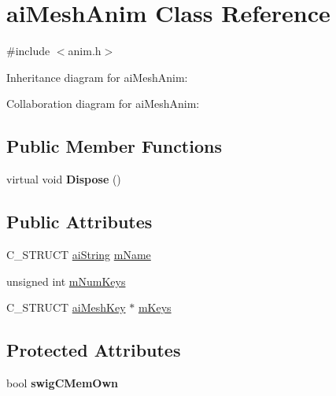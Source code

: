 \hypertarget{structai_mesh_anim}{\section{ai\+Mesh\+Anim Class Reference}
\label{structai_mesh_anim}
}


{\ttfamily \#include $<$anim.\+h$>$}



Inheritance diagram for ai\+Mesh\+Anim\+:


Collaboration diagram for ai\+Mesh\+Anim\+:
\subsection*{Public Member Functions}
\begin{DoxyCompactItemize}
\item 
\hypertarget{structai_mesh_anim_a9a456324848d6b3cd284720b9e6e7f54}{virtual void {\bfseries Dispose} ()}\label{structai_mesh_anim_a9a456324848d6b3cd284720b9e6e7f54}

\end{DoxyCompactItemize}
\subsection*{Public Attributes}
\begin{DoxyCompactItemize}
\item 
C\+\_\+\+S\+T\+R\+U\+C\+T \hyperlink{structai_string}{ai\+String} \hyperlink{structai_mesh_anim_a20751a739377fdba514c676ef4bda4c7}{m\+Name}
\item 
unsigned int \hyperlink{structai_mesh_anim_aa8702d42bf619ccc8414a556f41634d8}{m\+Num\+Keys}
\item 
C\+\_\+\+S\+T\+R\+U\+C\+T \hyperlink{structai_mesh_key}{ai\+Mesh\+Key} $\ast$ \hyperlink{structai_mesh_anim_abc78e9f6d7583c541447e8c389488f1b}{m\+Keys}
\end{DoxyCompactItemize}
\subsection*{Protected Attributes}
\begin{DoxyCompactItemize}
\item 
\hypertarget{structai_mesh_anim_a591427d234435cf1a765e6cc491411a3}{bool {\bfseries swig\+C\+Mem\+Own}}\label{structai_mesh_anim_a591427d234435cf1a765e6cc491411a3}

\end{DoxyCompactItemize}
